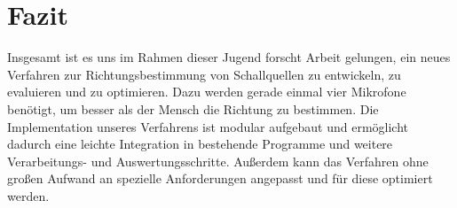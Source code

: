 \section{Fazit}
Insgesamt ist es uns im Rahmen dieser Jugend forscht Arbeit gelungen, ein neues Verfahren zur Richtungsbestimmung von Schallquellen zu entwickeln, zu evaluieren und zu optimieren. Dazu werden gerade einmal vier Mikrofone benötigt, um besser als der Mensch die Richtung zu bestimmen. Die Implementation unseres Verfahrens ist modular aufgebaut und ermöglicht dadurch eine leichte Integration in bestehende Programme und weitere Verarbeitungs- und Auswertungsschritte. Außerdem kann das Verfahren ohne großen Aufwand an spezielle Anforderungen angepasst und für diese optimiert werden.